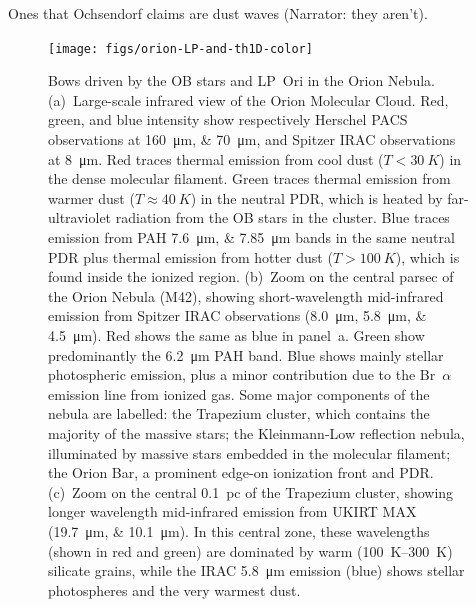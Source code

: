Ones that Ochsendorf claims are dust waves (Narrator: they aren't).


\begin{figure}
  \centering
  \texttt{[image: figs/orion-LP-and-th1D-color]}
  \caption{Bows driven by the OB stars \thD{} and LP~Ori in the Orion
    Nebula.  (a)~Large-scale infrared view of the Orion Molecular
    Cloud.  Red, green, and blue intensity show respectively Herschel
    PACS observations at \SIlist{160; 70}{\um}, and Spitzer IRAC
    observations at \SI{8}{\um}.  Red traces thermal emission from
    cool dust (\(T < \SI{30}{K}\)) in the dense molecular filament.
    Green traces thermal emission from warmer dust
    (\(T \approx \SI{40}{K}\)) in the neutral PDR, which is heated by
    far-ultraviolet radiation from the OB stars in the cluster. Blue
    traces emission from PAH \SIlist{7.6;7.85}{\um} bands in the same
    neutral PDR plus thermal emission from hotter dust
    (\(T > \SI{100}{K}\)), which is found inside the ionized \hii{}
    region.  (b)~Zoom on the central parsec of the Orion Nebula (M42),
    showing short-wavelength mid-infrared emission from Spitzer IRAC
    observations (\SIlist{8.0;5.8;4.5}{\um}).  Red shows the same as
    blue in panel~a.  Green show predominantly the \SI{6.2}{\um} PAH
    band.  Blue shows mainly stellar photospheric emission, plus a
    minor contribution due to the Br~\(\alpha\) emission line from ionized
    gas. Some major components of the nebula are labelled: the
    Trapezium cluster, which contains the majority of the massive
    stars; the Kleinmann-Low reflection nebula, illuminated by massive
    stars embedded in the molecular filament; the Orion Bar, a
    prominent edge-on ionization front and PDR.  (c)~Zoom on the
    central \SI{0.1}{pc} of the Trapezium cluster, showing longer
    wavelength mid-infrared emission from UKIRT MAX
    (\SIlist{19.7;10.1}{\um}).  In this central zone, these
    wavelengths (shown in red and green) are dominated by warm
    (\SIrange{100}{300}{K}) silicate grains, while the IRAC
    \SI{5.8}{\um} emission (blue) shows stellar photospheres and the
    very warmest dust.}
  \label{fig:orion-bows}
\end{figure}

